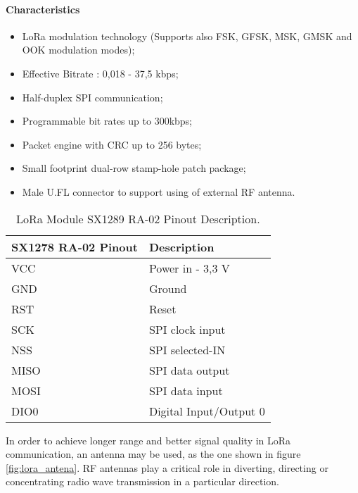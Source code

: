 \paragraph*{Characteristics}
\begin{itemize}
	\item LoRa modulation technology (Supports also FSK, GFSK, MSK, GMSK and OOK modulation modes);
	\item Effective Bitrate : 0,018 - 37,5 kbps;
	\item Half-duplex SPI communication;
	\item Programmable bit rates up to 300kbps;
	\item Packet engine with CRC up to 256 bytes;
	\item Small footprint dual-row stamp-hole patch package;
	\item Male U.FL connector to support using of external RF antenna.
\end{itemize}

\begin{table}[H]
	\centering
		\begin{tabular}{|m{5cm}|m{6cm}|}
			\hline
			\textbf{SX1278 RA-02 Pinout} & \textbf{Description}
			\\\hline\hline
		
			VCC & Power in - 3,3 V\\\hline
			GND & Ground\\\hline
			RST & Reset \\\hline
			SCK & SPI clock input\\\hline
			NSS & SPI selected-IN\\\hline
			MISO & SPI data output\\\hline
			MOSI & SPI data input\\\hline
			DIO0 & Digital Input/Output 0\\\hline
			\hline
		\end{tabular}
	
	\caption{LoRa Module SX1289 RA-02 Pinout Description.}
	\label{table:lora_module_pinout}
\end{table}

In order to achieve longer range and better signal quality in LoRa communication, an antenna may be used, as the one shown in figure \ref{fig:lora_antena}. RF antennas play a critical role in diverting, directing or concentrating radio wave transmission in a particular direction. 


